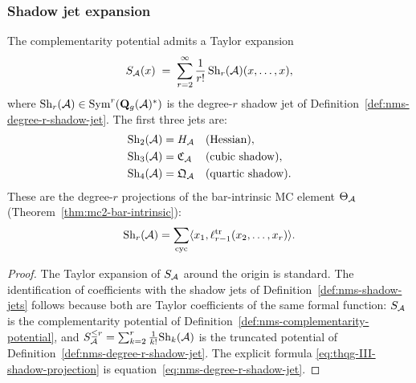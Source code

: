 \subsubsection{Shadow jet expansion}
\label{subsubsec:thqg-III-shadow-jets}

\begin{theorem}
\label{thm:thqg-III-shadow-jets}
The complementarity potential admits a Taylor expansion
\begin{equation}\label{eq:thqg-III-shadow-expansion}
S_{\mathcal{A}}(x)
\;=\;
\sum_{r=2}^{\infty}
\frac{1}{r!}\,\mathrm{Sh}_r(\mathcal{A})(x, \ldots, x),
\end{equation}
where $\mathrm{Sh}_r(\mathcal{A}) \in \operatorname{Sym}^r(\mathbf{Q}_g(\mathcal{A})^*)$ is the
degree-$r$ shadow jet of
Definition~\textup{\ref{def:nms-degree-r-shadow-jet}}.
The first three jets are:
\begin{align}
\mathrm{Sh}_2(\mathcal{A}) &= H_{\mathcal{A}}
 && \text{\textup{(}Hessian\textup{)}},
\label{eq:thqg-III-sh2}
\\
\mathrm{Sh}_3(\mathcal{A}) &= \mathfrak{C}_{\mathcal{A}}
 && \text{\textup{(}cubic shadow\textup{)}},
\label{eq:thqg-III-sh3}
\\
\mathrm{Sh}_4(\mathcal{A}) &= \mathfrak{Q}_{\mathcal{A}}
 && \text{\textup{(}quartic shadow\textup{)}}.
\label{eq:thqg-III-sh4}
\end{align}
These are the degree-$r$ projections of the bar-intrinsic MC
element $\Theta_{\mathcal{A}}$
\textup{(}Theorem~\textup{\ref{thm:mc2-bar-intrinsic})}:
\begin{equation}\label{eq:thqg-III-shadow-projection}
\mathrm{Sh}_r(\mathcal{A})
= \sum_{\mathrm{cyc}}
\langle x_1, \ell_{r-1}^{\mathrm{tr}}(x_2, \ldots, x_r) \rangle.
\end{equation}
\end{theorem}

\begin{proof}
The Taylor expansion of $S_{\mathcal{A}}$ around the origin is
standard. The identification of coefficients with the shadow
jets of
Definition~\ref{def:nms-shadow-jets} follows because both
are Taylor coefficients of the same formal function: $S_{\mathcal{A}}$
is the complementarity potential of
Definition~\ref{def:nms-complementarity-potential}, and
$S_{\mathcal{A}}^{\le r} = \sum_{k=2}^r \frac{1}{k!} \mathrm{Sh}_k(\mathcal{A})$
is the truncated potential of
Definition~\ref{def:nms-degree-r-shadow-jet}. The explicit
formula \eqref{eq:thqg-III-shadow-projection} is
equation~\eqref{eq:nms-degree-r-shadow-jet}.
\end{proof}


